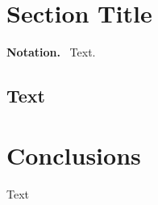 \documentclass[graybox]{svmult}
\newcommand{\mypar}[1]{\bigskip\noindent\textbf{#1.}~}
\begin{document}
\section{Section Title}
\label{sec:AStarAlgorithm}

\mypar{Notation}
Text. 

\subsection{Text}
\label{sec:Formalizing}



\section{Conclusions}
\label{sec:Conclusions}

Text

\printbibliography
%
%
\end{document}
